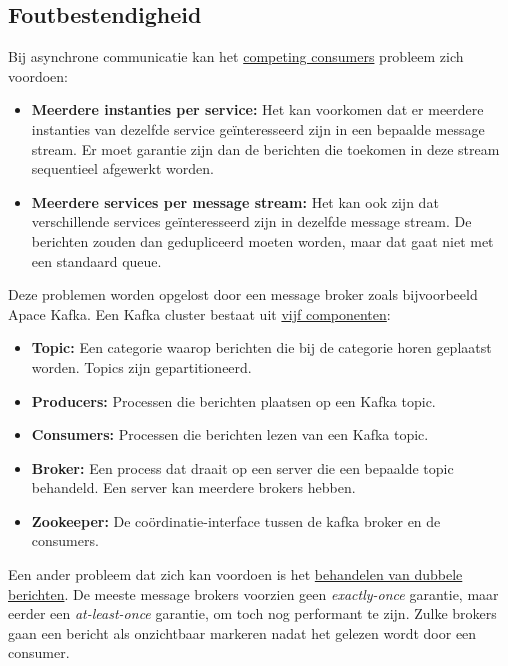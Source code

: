 	\subsection{Foutbestendigheid}
	Bij asynchrone communicatie kan het \uline{competing consumers} probleem zich voordoen:
	\begin{itemize}
		\item[\info] \textbf{Meerdere instanties per service:} Het kan voorkomen dat er meerdere instanties van dezelfde service geïnteresseerd zijn in een bepaalde message stream. Er moet garantie zijn dan de berichten die toekomen in deze stream sequentieel afgewerkt worden. 
		\item[\info] \textbf{Meerdere services per message stream:} Het kan ook zijn dat verschillende services geïnteresseerd zijn in dezelfde message stream. De berichten zouden dan gedupliceerd moeten worden, maar dat gaat niet met een standaard queue.
	\end{itemize}

	Deze problemen worden opgelost door een message broker zoals bijvoorbeeld Apace Kafka. Een Kafka cluster bestaat uit \uline{vijf componenten}:
	\begin{itemize}
		\item[\info] \textbf{Topic:} Een categorie waarop berichten die bij de categorie horen geplaatst worden. Topics zijn gepartitioneerd.
		\item[\info] \textbf{Producers:} Processen die berichten plaatsen op een Kafka topic.
		\item[\info] \textbf{Consumers:} Processen die berichten lezen van een Kafka topic.
		\item[\info] \textbf{Broker:} Een process dat draait op een server die een bepaalde topic behandeld. Een server kan meerdere brokers hebben.
		\item[\info] \textbf{Zookeeper:} De coördinatie-interface tussen de kafka broker en de consumers. 
		
	\end{itemize}

	Een ander probleem dat zich kan voordoen is het \uline{behandelen van dubbele berichten}. De meeste message brokers voorzien geen \emph{exactly-once} garantie, maar eerder een \emph{at-least-once} garantie, om toch nog performant te zijn. Zulke brokers gaan een bericht als onzichtbaar markeren nadat het gelezen wordt door een consumer.

